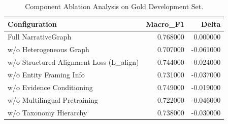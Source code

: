 \begin{table}
\caption{Component Ablation Analysis on Gold Development Set.}
\label{tab:ablations}
\begin{tabular}{lrr}
\toprule
Configuration & Macro_F1 & Delta \\
\midrule
Full NarrativeGraph & 0.768000 & 0.000000 \\
w/o Heterogeneous Graph & 0.707000 & -0.061000 \\
w/o Structured Alignment Loss (L_align) & 0.744000 & -0.024000 \\
w/o Entity Framing Info & 0.731000 & -0.037000 \\
w/o Evidence Conditioning & 0.749000 & -0.019000 \\
w/o Multilingual Pretraining & 0.722000 & -0.046000 \\
w/o Taxonomy Hierarchy & 0.738000 & -0.030000 \\
\bottomrule
\end{tabular}
\end{table}
